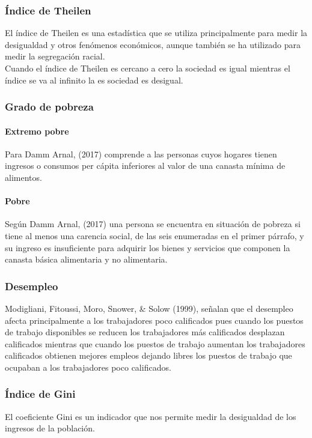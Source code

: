   \subsubsection{Índice de Theilen}
  
  El índice de Theilen es una estadística que se utiliza principalmente para medir la desigualdad y otros fenómenos económicos, aunque también se ha utilizado para medir la segregación racial. \\
Cuando el índice de Theilen es cercano a cero la sociedad es igual mientras el índice se va al infinito la es sociedad es desigual. 

  \subsubsection{Grado de pobreza}
  
\paragraph{Extremo pobre} 
Para Damm Arnal, (2017) comprende a las personas cuyos hogares tienen ingresos o consumos per cápita inferiores al valor de una canasta mínima de alimentos.

\paragraph{Pobre}

Según Damm Arnal, (2017) una persona se encuentra en situación de pobreza si tiene al menos una carencia social, de las seis enumeradas en el primer párrafo, y su ingreso es insuficiente para adquirir los bienes y servicios que componen la canasta básica alimentaria y no alimentaria.


  \subsubsection{Desempleo}
  
  Modigliani, Fitoussi, Moro, Snower, \& Solow (1999), señalan que el desempleo afecta principalmente a los trabajadores poco calificados pues cuando los puestos de trabajo disponibles se reducen los trabajadores más calificados desplazan calificados mientras que cuando los puestos de trabajo aumentan los trabajadores calificados obtienen mejores empleos dejando libres los puestos de trabajo que ocupaban a los trabajadores poco calificados.
  
  \subsubsection{Índice de Gini}
  
  El coeficiente Gini es un indicador que nos permite medir la desigualdad de los ingresos de la población.
  